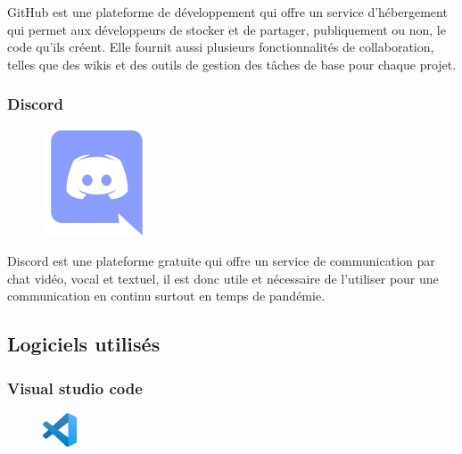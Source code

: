 GitHub est une plateforme de développement qui offre un service d’hébergement 
qui permet aux développeurs de stocker et de partager, publiquement ou non, 
le code qu’ils créent. Elle fournit aussi plusieurs fonctionnalités de 
collaboration, telles que des wikis et des outils de gestion des tâches de base 
pour chaque projet\cite{40}.

\subsubsection*{Discord}
\begin{figure}
    \vspace{-22pt}
    \begin{center}
        \includegraphics[scale=0.36]{images/logo/discord.png}
        \label{fig65}
    \end{center}
    \vspace{-20pt}
    \vspace{-10pt}
\end{figure}

Discord est une plateforme gratuite qui offre un service de communication par 
chat vidéo, vocal et textuel, il est donc utile et nécessaire de l’utiliser pour 
une communication en continu surtout en temps de pandémie\cite{40}.

\subsection{Logiciels utilisés}
\subsubsection*{Visual studio code}
\begin{figure}
    \vspace{-20pt}
    \begin{center}
        \includegraphics[width=0.09\textwidth]{images/VSCode logo.png}
        \label{fig66}
    \end{center}
    \vspace{-20pt}
    \vspace{-10pt}
\end{figure}

